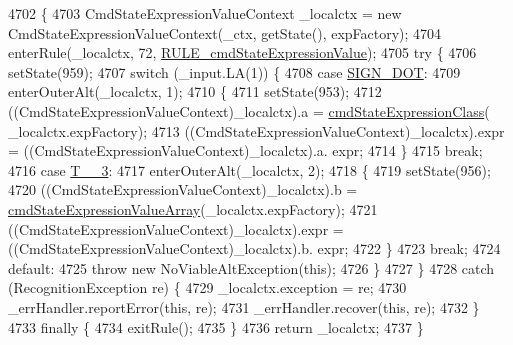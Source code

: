 \begin{DoxyCode}
4702                                                                                                            
                           \{
4703     CmdStateExpressionValueContext \_localctx = \textcolor{keyword}{new} CmdStateExpressionValueContext(\_ctx, getState(), 
      expFactory);
4704     enterRule(\_localctx, 72, \hyperlink{classgov_1_1nasa_1_1jpf_1_1inspector_1_1server_1_1expression_1_1parser_1_1_expression_grammar_parser_ab7a82f21ad4fdbe685351651c0fce7a8}{RULE\_cmdStateExpressionValue});
4705     \textcolor{keywordflow}{try} \{
4706       setState(959);
4707       \textcolor{keywordflow}{switch} (\_input.LA(1)) \{
4708       \textcolor{keywordflow}{case} \hyperlink{classgov_1_1nasa_1_1jpf_1_1inspector_1_1server_1_1expression_1_1parser_1_1_expression_grammar_parser_af578d1cac8553bcf6f52608a4e9125f1}{SIGN\_DOT}:
4709         enterOuterAlt(\_localctx, 1);
4710         \{
4711         setState(953);
4712         ((CmdStateExpressionValueContext)\_localctx).a = \hyperlink{classgov_1_1nasa_1_1jpf_1_1inspector_1_1server_1_1expression_1_1parser_1_1_expression_grammar_parser_a7a61b20a8b2616173f6b566712b279dd}{cmdStateExpressionClass}(
      \_localctx.expFactory);
4713          ((CmdStateExpressionValueContext)\_localctx).expr =  ((CmdStateExpressionValueContext)\_localctx).a.
      expr; 
4714         \}
4715         \textcolor{keywordflow}{break};
4716       \textcolor{keywordflow}{case} \hyperlink{classgov_1_1nasa_1_1jpf_1_1inspector_1_1server_1_1expression_1_1parser_1_1_expression_grammar_parser_a68f9589dcc3fc777455467ff010385ea}{T\_\_3}:
4717         enterOuterAlt(\_localctx, 2);
4718         \{
4719         setState(956);
4720         ((CmdStateExpressionValueContext)\_localctx).b = 
      \hyperlink{classgov_1_1nasa_1_1jpf_1_1inspector_1_1server_1_1expression_1_1parser_1_1_expression_grammar_parser_a5ca6781f2d54419c03ff89334158c305}{cmdStateExpressionValueArray}(\_localctx.expFactory);
4721          ((CmdStateExpressionValueContext)\_localctx).expr =  ((CmdStateExpressionValueContext)\_localctx).b.
      expr; 
4722         \}
4723         \textcolor{keywordflow}{break};
4724       \textcolor{keywordflow}{default}:
4725         \textcolor{keywordflow}{throw} \textcolor{keyword}{new} NoViableAltException(\textcolor{keyword}{this});
4726       \}
4727     \}
4728     \textcolor{keywordflow}{catch} (RecognitionException re) \{
4729       \_localctx.exception = re;
4730       \_errHandler.reportError(\textcolor{keyword}{this}, re);
4731       \_errHandler.recover(\textcolor{keyword}{this}, re);
4732     \}
4733     \textcolor{keywordflow}{finally} \{
4734       exitRule();
4735     \}
4736     \textcolor{keywordflow}{return} \_localctx;
4737   \}
\end{DoxyCode}
